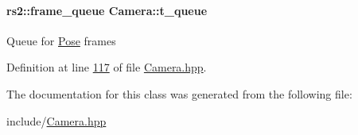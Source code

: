 \paragraph[{\texorpdfstring{t\+\_\+queue}{t_queue}}]{\setlength{\rightskip}{0pt plus 5cm}rs2\+::frame\+\_\+queue Camera\+::t\+\_\+queue}\hypertarget{classCamera_ad8a4c52c0ae125ab8ca66902408f5e95}{}\label{classCamera_ad8a4c52c0ae125ab8ca66902408f5e95}
Queue for \hyperlink{structPose}{Pose} frames 

Definition at line \hyperlink{Camera_8hpp_source_l00117}{117} of file \hyperlink{Camera_8hpp_source}{Camera.\+hpp}.



The documentation for this class was generated from the following file\+:\begin{DoxyCompactItemize}
\item 
include/\hyperlink{Camera_8hpp}{Camera.\+hpp}\end{DoxyCompactItemize}
